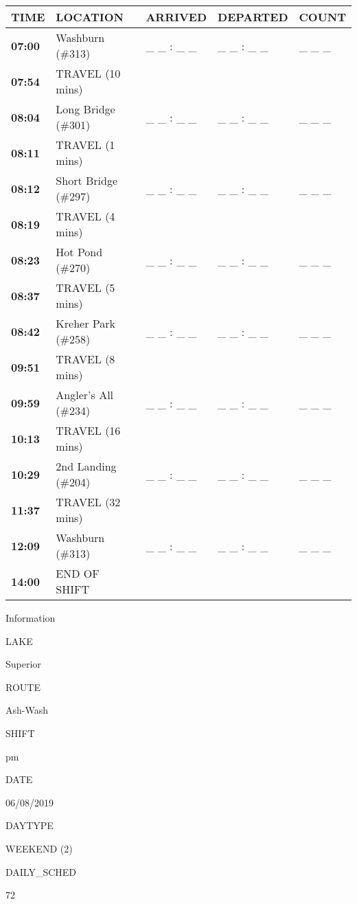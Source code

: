 \documentclass[]{article}
\begin{document}
\begin{tabular}{>{\bfseries}lllll}
\toprule
\textbf{TIME} & \textbf{LOCATION} & \textbf{ARRIVED} & \textbf{DEPARTED} & \textbf{COUNT}\\
\midrule
07:00 & Washburn (\#313) & \_ \_ : \_ \_ & \_ \_ : \_ \_ & \_ \_ \_\\
07:54 & TRAVEL (10 mins) &  &  & \\
08:04 & Long Bridge (\#301) & \_ \_ : \_ \_ & \_ \_ : \_ \_ & \_ \_ \_\\
08:11 & TRAVEL (1 mins) &  &  & \\
08:12 & Short Bridge (\#297) & \_ \_ : \_ \_ & \_ \_ : \_ \_ & \_ \_ \_\\
08:19 & TRAVEL (4 mins) &  &  & \\
08:23 & Hot Pond (\#270) & \_ \_ : \_ \_ & \_ \_ : \_ \_ & \_ \_ \_\\
08:37 & TRAVEL (5 mins) &  &  & \\
08:42 & Kreher Park (\#258) & \_ \_ : \_ \_ & \_ \_ : \_ \_ & \_ \_ \_\\
09:51 & TRAVEL (8 mins) &  &  & \\
09:59 & Angler's All (\#234) & \_ \_ : \_ \_ & \_ \_ : \_ \_ & \_ \_ \_\\
10:13 & TRAVEL (16 mins) &  &  & \\
10:29 & 2nd Landing (\#204) & \_ \_ : \_ \_ & \_ \_ : \_ \_ & \_ \_ \_\\
11:37 & TRAVEL (32 mins) &  &  & \\
12:09 & Washburn (\#313) & \_ \_ : \_ \_ & \_ \_ : \_ \_ & \_ \_ \_\\
14:00 & END OF SHIFT &  &  & \\
\bottomrule
\end{tabular}\newpage

Information

LAKE

Superior

ROUTE

Ash-Wash

SHIFT

pm

DATE

06/08/2019

DAYTYPE

WEEKEND (2)

DAILY\_SCHED

72

\vspace{24pt}
\end{document}
